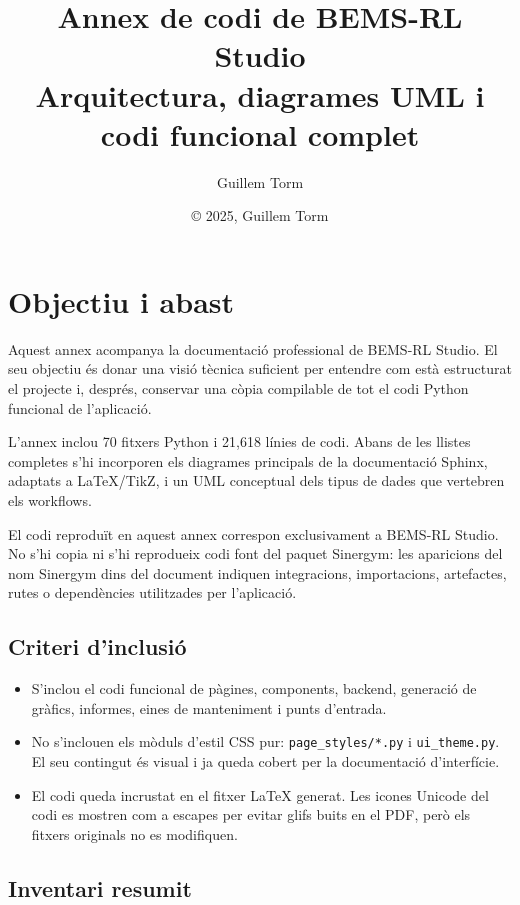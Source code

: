 \documentclass[10pt,a4paper]{article}
\title{\textbf{Annex de codi de BEMS-RL Studio}\\
\large Arquitectura, diagrames UML i codi funcional complet}
\author{Guillem Torm}
\date{© 2025, Guillem Torm}
\begin{document}
\maketitle
\tableofcontents
\clearpage

\section{Objectiu i abast}

Aquest annex acompanya la documentació professional de BEMS-RL Studio. El seu
objectiu és donar una visió tècnica suficient per entendre com està estructurat
el projecte i, després, conservar una còpia compilable de tot el codi Python
funcional de l'aplicació.

L'annex inclou 70 fitxers Python i 21,618 línies de codi.
Abans de les llistes completes s'hi incorporen els diagrames principals de la
documentació Sphinx, adaptats a LaTeX/TikZ, i un UML conceptual dels tipus de
dades que vertebren els workflows.

El codi reproduït en aquest annex correspon exclusivament a BEMS-RL Studio.
No s'hi copia ni s'hi reprodueix codi font del paquet Sinergym: les aparicions
del nom Sinergym dins del document indiquen integracions, importacions,
artefactes, rutes o dependències utilitzades per l'aplicació.

\subsection{Criteri d'inclusió}

\begin{itemize}
  \item S'inclou el codi funcional de pàgines, components, backend, generació de
        gràfics, informes, eines de manteniment i punts d'entrada.
  \item No s'inclouen els mòduls d'estil CSS pur: \texttt{page\_styles/*.py} i
        \texttt{ui\_theme.py}. El seu contingut és visual i ja queda cobert per
        la documentació d'interfície.
  \item El codi queda incrustat en el fitxer LaTeX generat. Les icones Unicode
        del codi es mostren com a escapes per evitar glifs buits en el PDF,
        però els fitxers originals no es modifiquen.
\end{itemize}

\subsection{Inventari resumit}
\end{document}
